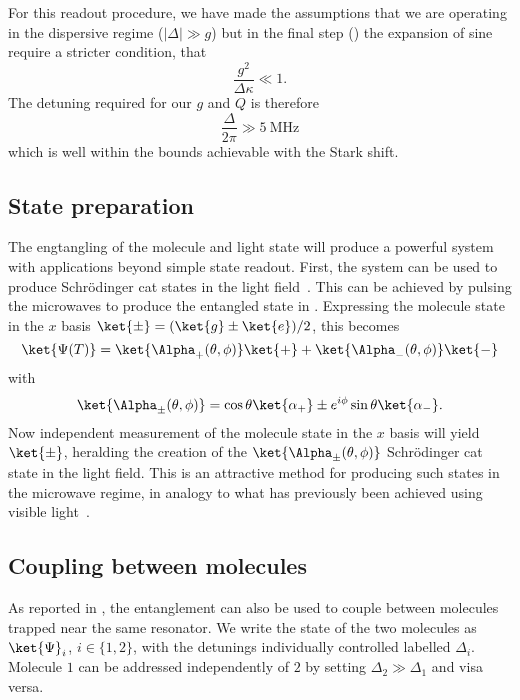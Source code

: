 For this readout procedure, we have made the assumptions that we are operating
in the dispersive regime ($|\Delta| \gg g$) but in the final step
() the expansion of sine require a stricter
condition, that 
%
\begin{equation}
  \frac{g^2}{\Delta\kappa} \ll 1.
\end{equation}
%
The detuning required for our $g$ and $Q$ is therefore
%
\begin{equation}
  \frac{\Delta}{2 \pi} \gg \SI{5}{\mega\hertz}
\end{equation}
%
which is well within the bounds achievable with the Stark shift.

\subsection{State preparation}

The engtangling of the molecule and light state will produce a powerful system
with applications beyond simple state readout. First, the system can be used to
produce Schr\"odinger cat states in the light field~\cite{Andre2006}. This can be achieved
by pulsing the microwaves to produce the entangled state in
. Expressing the molecule state in the $x$ basis
$\ket{\pm} = (\ket{g} \pm \ket{e})/2$, this becomes
%
\begin{equation}
  \ket{\Psi(T)} = \ket{\Alpha_+(\theta, \phi) }\ket{+} + \ket{\Alpha_-(\theta,
  \phi)}\ket{-}
\end{equation}
%
with
%
\begin{equation}
  \ket{\Alpha_\pm(\theta, \phi)} = \cos\theta\ket{\alpha_+} \pm
  e^{i\phi}\sin\theta\ket{\alpha_-}.
\end{equation}
%
Now independent measurement of the molecule state in the $x$ basis will yield
$\ket{\pm}$, heralding the creation of the $\ket{\Alpha_\pm(\theta, \phi)}$
Schr\"odinger cat state in the light field. This is an attractive method for
producing such states in the microwave regime, in analogy to what has
previously been achieved using visible light~\cite{Hacker2019}.

\subsection{Coupling between molecules}

As reported in , the entanglement can also be used to
couple between molecules trapped near the same resonator. We write the state of
the two molecules as $\ket{\Psi}_i$, $i\in\{1,2\}$, with the detunings
individually controlled labelled $\Delta_i$. Molecule $1$ can be addressed
independently of $2$ by setting $\Delta_2 \gg \Delta_1$ and visa versa. 

